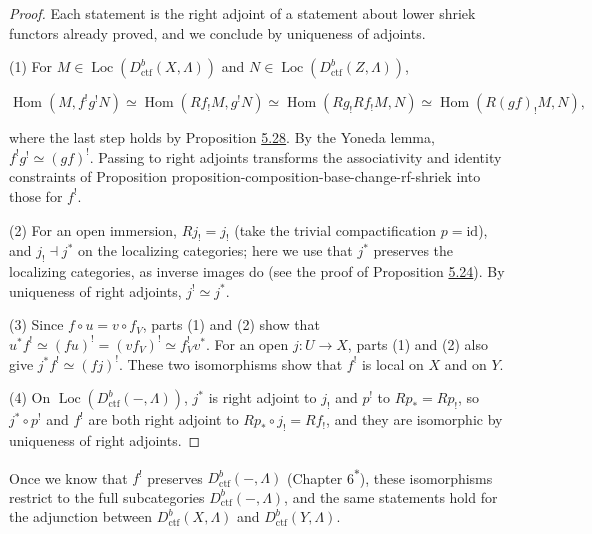 \documentclass[11pt]{article}
\newcommand{\bpout}[1]{#1\textsuperscript{\hyperlink{bp-outside}{\ensuremath{\ast}}}}
\providecommand{\Hom}{}\renewcommand{\Hom}{\operatorname{Hom}}
\providecommand{\Loc}{}\renewcommand{\Loc}{\operatorname{Loc}}
\begin{document}
\begin{proof}[{Proof}]\label{bp105}%
Each statement is the right adjoint of a statement about lower shriek functors already proved, and we conclude by uniqueness of adjoints.

(1) For \(M\in\Loc(D^b_{\mathrm{ctf}}(X,\Lambda))\) and \(N\in\Loc(D^b_{\mathrm{ctf}}(Z,\Lambda))\),

\[
\Hom(M,f^!g^!N)
\simeq\Hom(Rf_!M,g^!N)
\simeq\Hom(Rg_!Rf_!M,N)
\simeq\Hom(R(gf)_!M,N),
\]

where the last step holds by Proposition \hyperref[bp90]{5.28}. By the Yoneda lemma, \(f^!g^!\simeq(gf)^!\). Passing to right adjoints transforms the associativity and identity constraints of Proposition proposition-composition-base-change-rf-shriek into those for \(f^!\).

(2) For an open immersion, \(Rj_!=j_!\) (take the trivial compactification \(p=\mathrm{id}\)), and \(j_!\dashv j^*\) on the localizing categories; here we use that \(j^*\) preserves the localizing categories, as inverse images do (see the proof of Proposition \hyperref[bp82]{5.24}). By uniqueness of right adjoints, \(j^!\simeq j^*\).

(3) Since \(f\circ u=v\circ f_V\), parts (1) and (2) show that \(u^*f^!\simeq(fu)^!=(vf_V)^!\simeq f_V^!v^*\). For an open \(j:U\to X\), parts (1) and (2) also give \(j^*f^!\simeq(fj)^!\). These two isomorphisms show that \(f^!\) is local on \(X\) and on \(Y\).

(4) On \(\Loc(D^b_{\mathrm{ctf}}(-,\Lambda))\), \(j^*\) is right adjoint to \(j_!\) and \(p^!\) to \(Rp_*=Rp_!\), so \(j^*\circ p^!\) and \(f^!\) are both right adjoint to \(Rp_*\circ j_!=Rf_!\), and they are isomorphic by uniqueness of right adjoints.
\end{proof}

\label{bp106}%
Once we know that \(f^!\) preserves \(D^b_{\mathrm{ctf}}(-,\Lambda)\) (Chapter \bpout{6}), these isomorphisms restrict to the full subcategories \(D^b_{\mathrm{ctf}}(-,\Lambda)\), and the same statements hold for the adjunction between \(D^b_{\mathrm{ctf}}(X,\Lambda)\) and \(D^b_{\mathrm{ctf}}(Y,\Lambda)\).



\clearpage{}\hypertarget{bp-outside}{}%
\end{document}
